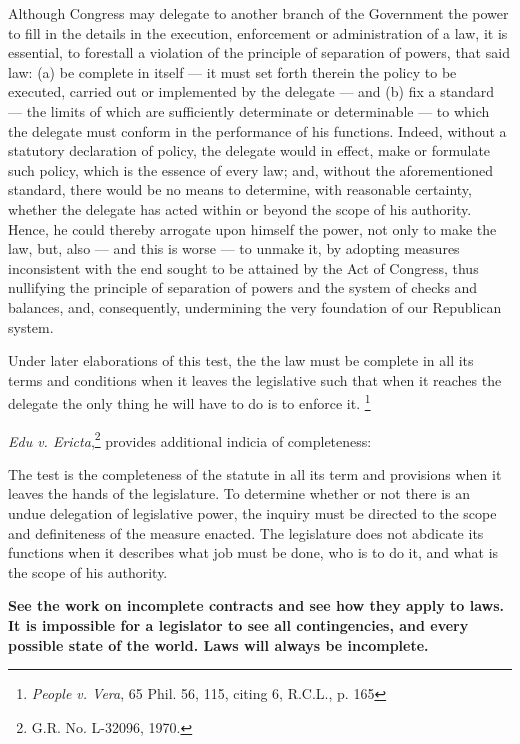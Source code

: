 \documentclass[../main.tex]{subfiles}
\begin{document}
\begin{displayquote}
    Although Congress may delegate to another branch of the Government the power to fill in the details in the execution, enforcement or administration of a law, it is essential, to forestall a violation of the principle of separation of powers, that said law: (a) be complete in itself — it must set forth therein the policy to be executed, carried out or implemented by the delegate — and (b) fix a standard — the limits of which are sufficiently determinate or determinable — to which the delegate must conform in the performance of his functions. Indeed, without a statutory declaration of policy, the delegate would in effect, make or formulate such policy, which is the essence of every law; and, without the aforementioned standard, there would be no means to determine, with reasonable certainty, whether the delegate has acted within or beyond the scope of his authority. Hence, he could thereby arrogate upon himself the power, not only to make the law, but, also — and this is worse — to unmake it, by adopting measures inconsistent with the end sought to be attained by the Act of Congress, thus nullifying the principle of separation of powers and the system of checks and balances, and, consequently, undermining the very foundation of our Republican system.
\end{displayquote}

Under later elaborations of this test, the the law must be complete in all its terms and conditions when it leaves the legislative such that when it reaches the delegate the only thing he will have to do is to enforce it. \footnote{\textit{People v. Vera}, 65 Phil. 56, 115, citing 6, R.C.L., p. 165}

\textit{Edu v. Ericta},\footnote{G.R. No. L-32096, 1970.} provides additional indicia of completeness: 

\begin{displayquote}
    The test is the completeness of the statute in all its term and provisions when it leaves the hands of the legislature. To determine whether or not there is an undue delegation of legislative power, the inquiry must be directed to the scope and definiteness of the measure enacted. The legislature does not abdicate its functions when it describes what job must be done, who is to do it, and what is the scope of his authority.
\end{displayquote}

\begin{note}
    \textbf{See the work on incomplete contracts and see how they apply to laws. It is impossible for a legislator to see all contingencies, and every possible state of the world. Laws will always be incomplete.}
\end{note}
\end{document}
